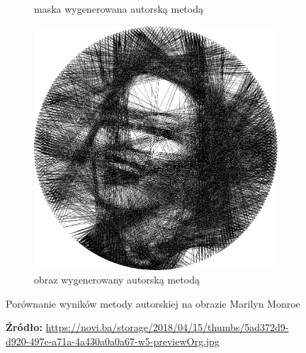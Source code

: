 \begin{figure}[H]
\begin{subfigure}{0.40\textwidth}
        \caption{maska wygenerowana autorską metodą}
        \label{comp-comp-monroe-c}
    \end{subfigure}
    \begin{subfigure}{0.40\textwidth}
        \centering
        \includegraphics[width = \textwidth]{img/6-comp/monroe-portrait_e_i2000_c20_inv0_bg10_obj1_ed1.png}
        \caption{obraz wygenerowany autorską metodą}
        \label{comp-comp-monroe-d}
    \end{subfigure}
    \caption{Porównanie wyników metody autorskiej na obrazie Marilyn Monroe}
    \caption*{\footnotesize{\textbf{Źródło:} {\url{https://novi.ba/storage/2018/04/15/thumbs/5ad372d9-d920-497e-a71a-4a430a0a0a67-w5-previewOrg.jpg}}}}
    \label{comp-comp-monroe}
    \end{figure}
    
